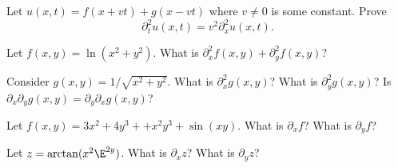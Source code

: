 \begin{exercise}
Let $u(x,t) = f(x+vt) + g(x-vt)$ where $v\not=0$ is some
constant. Prove
\begin{equation}
\partial_{t}^{2}u(x,t)=v^{2}\partial_{x}^{2}u(x,t).
\end{equation}
\end{exercise}
\begin{exercise}
Let $f(x,y)=\ln(x^{2}+y^{2})$. What is
$\partial_{x}^{2}f(x,y)+\partial_{y}^{2}f(x,y)$? 
\end{exercise}
\begin{exercise}
Consider $g(x,y)=1/\sqrt{x^{2}+y^{2}}$. What is
$\partial_{x}^{2}g(x,y)$? What is $\partial_{y}^{2}g(x,y)$? Is
$\partial_{x}\partial_{y}g(x,y)=\partial_{y}\partial_{x}g(x,y)$? 
\end{exercise}
\begin{exercise}
Let $f(x,y)=3x^{2}+4y^{3}++x^{2}y^{3}+\sin(xy)$. What is
$\partial_{x}f$? What is $\partial_{y}f$?
\end{exercise}
\begin{exercise}
Let $z=\arctan(x^{2}\E^{2y})$. What is $\partial_{x}z$? What is
$\partial_{y}z$? 
\end{exercise}
